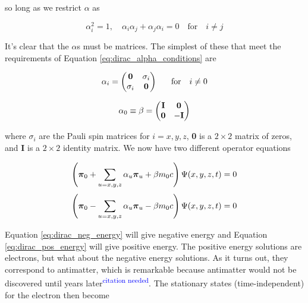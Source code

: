 \documentclass[12pt]{report}
\newcommand{\citethis}{\textsuperscript{\textcolor{blue}{citation needed}}} %
\begin{document}
so long as we restrict $\alpha$ as

\begin{equation}
\label{eq:dirac_alpha_conditions}
\alpha^{2}_{i} = 1, \quad \alpha_{i}\alpha_{j} + \alpha_{j}\alpha_{i} = 0 \quad \text{for} \quad i \neq j
\end{equation}

It's clear that the $\alpha$s must be matrices. The simplest of these that meet the requirements of Equation \ref{eq:dirac_alpha_conditions} are

\begin{equation}
\label{eq:dirac_alpha_matrix}
\alpha_{i} = 
\begin{pmatrix}
{\bf{0}}	&	\sigma_{i}	\\
\sigma_{i}	&	{\bf{0}}	\\
\end{pmatrix} 
\quad \text{for} \quad i \neq 0
\end{equation}

\begin{equation}
\label{eq:dirac_beta_matrix}
\alpha_{0} \equiv \beta = 
\begin{pmatrix}
{\bf{I}}	&	{\bf{0}}	\\
{\bf{0}}	&	-{\bf{I}}	\\
\end{pmatrix} 
\end{equation}

where $\sigma_{i}$ are the Pauli spin matrices for $i=x,y,z$, \textbf{0} is a $2\times2$ matrix of zeros, and \textbf{I} is a $2\times2$ identity matrix. We now have two different operator equations

\begin{equation}
\label{eq:dirac_neg_energy}
\left({\bf{\pi}}_{0} + \sum_{u=x,y,z}\alpha_{u}{\bf{\pi}}_{u} + \beta{}m_{0}c\right)\Psi(x, y, z, t) = 0
\end{equation}
\begin{equation}
\label{eq:dirac_pos_energy}
\left({\bf{\pi}}_{0} - \sum_{u=x,y,z}\alpha_{u}{\bf{\pi}}_{u} - \beta{}m_{0}c\right)\Psi(x, y, z, t) = 0
\end{equation}

Equation \ref{eq:dirac_neg_energy} will give negative energy and Equation \ref{eq:dirac_pos_energy} will give positive energy. The positive energy solutions are electrons, but what about the negative energy solutions. As it turns out, they correspond to antimatter, which is remarkable because antimatter would not be discovered until years later\citethis. The stationary states (time-independent) for the electron then become
\end{document}
